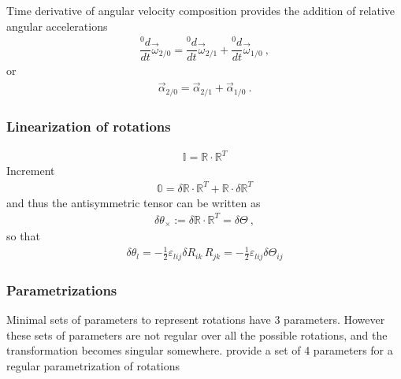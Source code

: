 \documentclass[letterpaper,10pt,english]{jupyterBook}
\begin{document}
\sphinxAtStartPar
{} Time derivative of angular velocity composition provides the addition of relative angular accelerations
\begin{equation*}
\begin{split}\dfrac{{}^0 d}{dt} \vec{\omega}_{2/0} = \dfrac{{}^0 d}{dt} \vec{\omega}_{2/1} + \dfrac{{}^0 d}{dt} \vec{\omega}_{1/0} \ ,\end{split}
\end{equation*}
\sphinxAtStartPar
or
\begin{equation*}
\begin{split}\vec{\alpha}_{2/0} = \vec{\alpha}_{2/1} + \vec{\alpha}_{1/0} \ .\end{split}
\end{equation*}

\subsubsection{Linearization of rotations}
\label{\detokenize{ch/kinematics-rotations-tensors:linearization-of-rotations}}\begin{equation*}
\begin{split}\mathbb{I} = \mathbb{R} \cdot \mathbb{R}^T\end{split}
\end{equation*}
\sphinxAtStartPar
Increment
\begin{equation*}
\begin{split}\mathbb{0} = \delta \mathbb{R} \cdot \mathbb{R}^T + \mathbb{R} \cdot \delta \mathbb{R}^T\end{split}
\end{equation*}
\sphinxAtStartPar
and thus the antisymmetric tensor can be written as
\begin{equation*}
\begin{split}\delta \theta_{\times} := \delta \mathbb{R} \cdot \mathbb{R}^T = \delta \mathbb{\Theta} \ ,\end{split}
\end{equation*}
\sphinxAtStartPar
so that
\begin{equation*}
\begin{split}\delta \theta_l = -\frac{1}{2} \varepsilon_{lij} \delta R_{ik} \, R_{jk} = - \frac{1}{2} \varepsilon_{lij} \delta \Theta_{ij}\end{split}
\end{equation*}

\subsubsection{Parametrizations}
\label{\detokenize{ch/kinematics-rotations-tensors:parametrizations}}\label{\detokenize{ch/kinematics-rotations-tensors:classical-mechanics-kinematics-rotations-param}}
\sphinxAtStartPar
Minimal sets of parameters to represent rotations have 3 parameters. However these sets of parameters are not regular over all the possible rotations, and the transformation becomes singular somewhere. {\hyperref[\detokenize{ch/kinematics-rotations-tensors:classical-mechanics-kinematics-rotations-param-quaternions}]{}} provide a set of 4 parameters for a regular parametrization of rotations
\end{document}
